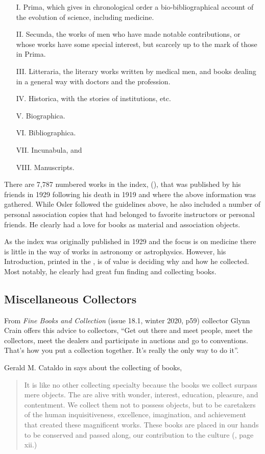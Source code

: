 \documentclass[letterpaper]{article}
\begin{document}
\begin{itemize}
\item[I.] Prima, which gives in chronological order a
  bio-bibliographical account of the evolution of science, including
  medicine.
\item[II.] Secunda, the works of men who have made notable
  contributions, or whose works have some special interest, but
  scarcely up to the mark of those in Prima.
\item[III.] Litteraria, the literary works written by medical men, and
  books dealing in a general way with doctors and the profession.
\item[IV.] Historica, with the stories of institutions, etc.
\item[V.] Biographica.
\item[VI.] Bibliographica.
\item[VII.] Incunabula, and
\item[VIII.] Manuscripts.
\end{itemize}

There are 7,787 numbered works in the index,  (\cite{Francis2000}), that was published by his friends
in 1929 following his death in 1919 and where the above information
was gathered.  While Osler followed the guidelines above, he also
included a number of personal association copies that had belonged to
favorite instructors or personal friends. He clearly had a love for
books as material and association objects.

As the index was originally published in 1929 and the focus is on
medicine there is little in the way of  works in astronomy or
astrophysics.  However, his Introduction, printed in the
, is of value is deciding why and how he
collected. Most notably, he clearly had great fun finding and
collecting books.


\subsection{Miscellaneous Collectors}

From {\itshape Fine Books and Collection} (issue 18.1, winter 2020,
p59) collector Glynn Crain offers this advice to collectors, ``Get out
there and meet people, meet the collectors, meet the dealers and
participate in auctions and go to conventions. That's how you put a
collection together. It's really the only way to do it''.

Gerald M. Cataldo in  says about the
collecting of books,
\begin{quotation}
  It is like no other collecting specialty because the books we collect
  surpass mere objects. The are alive with wonder, interest, education,
  pleasure, and contentment. We collect them not to possess objects, but
  to be caretakers of the human inquisitiveness, excellence, imagination,
  and achievement that created these magnificent works. These books are
  placed in our hands to be conserved and passed along, our contribution
  to the culture (\cite{Cataldo2010}, page xii.)
\end{quotation}
\end{document}

